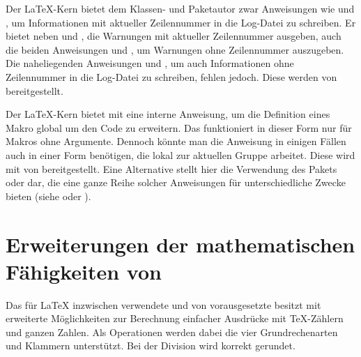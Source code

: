 \begin{Declaration}
\end{Declaration}%
Der \LaTeX-Kern bietet dem Klassen- und Paketautor zwar Anweisungen wie
 und , um Informationen mit aktueller
Zeilennummer in die Log-Datei zu schreiben. Er bietet neben
 und , die Warnungen mit aktueller
Zeilennummer ausgeben, auch die beiden Anweisungen
 und , um Warnungen ohne
Zeilennummer auszugeben. Die naheliegenden Anweisungen
 und , um auch Informationen
ohne Zeilennummer in die Log-Datei zu schreiben, fehlen jedoch. Diese werden
von  bereitgestellt.
%
\EndIndexGroup


\begin{Declaration}
\end{Declaration}%
Der \LaTeX-Kern bietet mit  eine interne Anweisung, um
die Definition eines Makro  global um den Code
 zu erweitern. Das funktioniert in dieser Form nur für
Makros ohne Argumente. Dennoch könnte man die Anweisung in einigen Fällen
auch in einer Form benötigen, die lokal zur aktuellen Gruppe arbeitet. Diese
wird mit  von  bereitgestellt. Eine
Alternative stellt hier die Verwendung des Pakets
 oder
 dar, die eine ganze Reihe solcher
Anweisungen für unterschiedliche Zwecke bieten (siehe
\cite{package:etoolbox} oder \cite{package:xpatch}).
%
\EndIndexGroup


\section{Erweiterungen der mathematischen Fähigkeiten von \eTeX}

Das für \LaTeX{} inzwischen verwendete und von \KOMAScript{} vorausgesetzte
\eTeX{} besitzt mit  erweiterte Möglichkeiten
zur Berechnung einfacher Ausdrücke mit \TeX-Zählern und ganzen Zahlen. Als
Operationen werden dabei die vier Grundrechenarten und Klammern
unterstützt. Bei der Division wird korrekt gerundet.
\iffalse Manchmal sind weitere Operationen nützlich.\fi%

